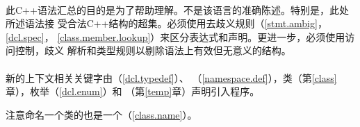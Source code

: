 
\paragraph{}
此C++语法汇总的目的是为了帮助理解。不是该语言的准确陈述。特别是，此处所述语法接
受合法C++结构的超集。必须使用去歧义规则（\ref{stmt.ambig}，\ref{dcl.spec}，
\ref{class.member.lookup}）来区分表达式和声明。更进一步，必须使用访问控制，歧义
解析和类型规则以剔除语法上有效但无意义的结构。

\paragraph{}
新的上下文相关关键字由（\ref{dcl.typedef}）、
（\ref{namespace.def}），类（第\ref{class}章），枚举（\ref{dcl.enum}）和
（第\ref{temp}章）声明引入程序。


注意命名一个类的也是一个（\ref{class.name}）。


